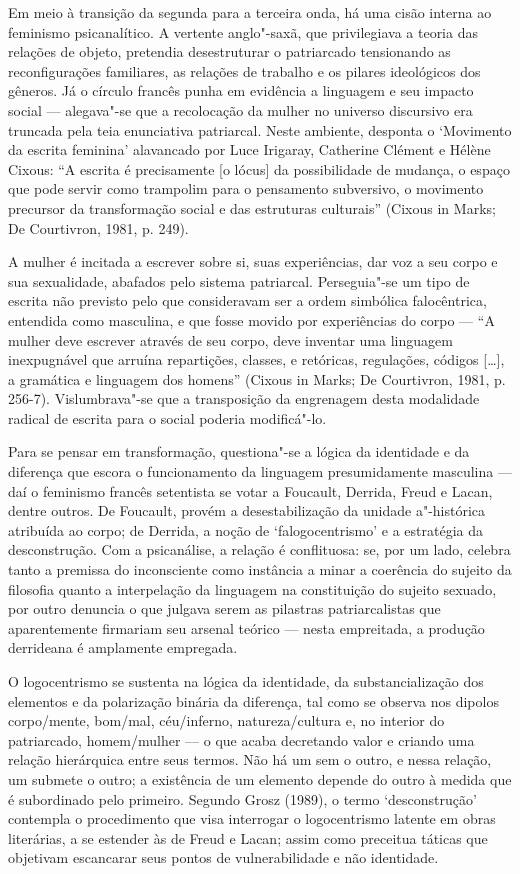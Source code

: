 Em meio à transição da segunda para a terceira onda, há uma cisão
interna ao feminismo psicanalítico. A vertente anglo"-saxã, que
privilegiava a teoria das relações de objeto, pretendia desestruturar o
patriarcado tensionando as reconfigurações familiares, as relações de
trabalho e os pilares ideológicos dos gêneros. Já o círculo francês
punha em evidência a linguagem e seu impacto social --- alegava"-se que a
recolocação da mulher no universo discursivo era truncada pela teia
enunciativa patriarcal. Neste ambiente, desponta o `Movimento da escrita
feminina' alavancado por Luce Irigaray, Catherine Clément e Hélène
Cixous: ``A escrita é precisamente {[}o lócus{]} da possibilidade de
mudança, o espaço que pode servir como trampolim para o pensamento
subversivo, o movimento precursor da transformação social e das
estruturas culturais'' (Cixous in Marks; De Courtivron, 1981, p.
249).

A mulher é incitada a escrever sobre si, suas experiências, dar voz a
seu corpo e sua sexualidade, abafados pelo sistema patriarcal.
Perseguia"-se um tipo de escrita não previsto pelo que consideravam ser a
ordem simbólica falocêntrica, entendida como masculina, e que fosse
movido por experiências do corpo --- ``A mulher deve escrever através de
seu corpo, deve inventar uma linguagem inexpugnável que arruína
repartições, classes, e retóricas, regulações, códigos {[}\ldots{}{]}, a
gramática e linguagem dos homens'' (Cixous in Marks; De Courtivron,
1981, p. 256-7). Vislumbrava"-se que a transposição da engrenagem
desta modalidade radical de escrita para o social poderia modificá"-lo.

Para se pensar em transformação, questiona"-se a lógica da identidade e
da diferença que escora o funcionamento da linguagem presumidamente
masculina --- daí o feminismo francês setentista se votar a Foucault,
Derrida, Freud e Lacan, dentre outros. De Foucault, provém a
desestabilização da unidade a"-histórica atribuída ao corpo; de Derrida,
a noção de `falogocentrismo' e a estratégia da desconstrução. Com a
psicanálise, a relação é conflituosa: se, por um lado, celebra tanto a
premissa do inconsciente como instância a minar a coerência do sujeito
da filosofia quanto a interpelação da linguagem na constituição do
sujeito sexuado, por outro denuncia o que julgava serem as pilastras
patriarcalistas que aparentemente firmariam seu arsenal teórico --- nesta
empreitada, a produção derrideana é amplamente empregada.

O logocentrismo se sustenta na lógica da identidade, da
substancialização dos elementos e da polarização binária da diferença,
tal como se observa nos dipolos corpo/mente, bom/mal, céu/inferno,
natureza/cultura e, no interior do patriarcado, homem/mulher --- o que
acaba decretando valor e criando uma relação hierárquica entre seus
termos. Não há um sem o outro, e nessa relação, um submete o outro; a
existência de um elemento depende do outro à medida que é subordinado
pelo primeiro. Segundo Grosz (1989), o termo `desconstrução' contempla o
procedimento que visa interrogar o logocentrismo latente em obras
literárias, a se estender às de Freud e Lacan; assim como preceitua
táticas que objetivam escancarar seus pontos de vulnerabilidade e não
identidade.


